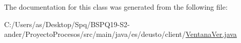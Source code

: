 The documentation for this class was generated from the following file\+:\begin{DoxyCompactItemize}
\item 
C\+:/\+Users/as/\+Desktop/\+Spq/\+B\+S\+P\+Q19-\/\+S2-\/ander/\+Proyecto\+Procesos/src/main/java/es/deusto/client/\mbox{\hyperlink{_ventana_ver_8java}{Ventana\+Ver.\+java}}\end{DoxyCompactItemize}

